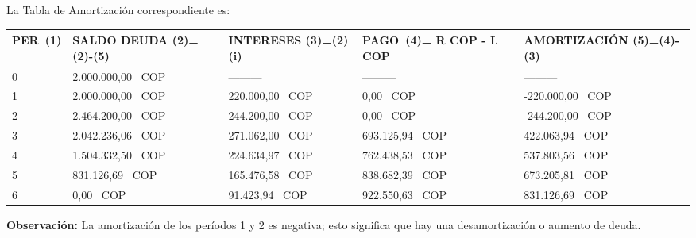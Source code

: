 La Tabla de Amortización correspondiente es:
\begin{spacing}{1.1}
	\begin{center}
		\begin{tabular}{|p{1cm}|p{2.5cm}|p{2.5cm}|p{2.5cm}|p{3cm}|}
			\hline
			\rowcolor{white!50}
			\textbf{PER\ (1)} & \textbf{SALDO DEUDA (2)=(2)-(5)} & \textbf{INTERESES  (3)=(2)(i)} & \textbf{PAGO\ (4)= R COP - L COP} & \textbf{AMORTIZACIÓN  (5)=(4)-(3)} \\ \hline
			
			0                 &  2.000.000,00 \ COP                  & ---------                       & ---------                   & ---------                          \\ \hline
			1                 &  2.000.000,00 \ COP                   &  220.000,00 \ COP                   & 0,00 \ COP                      &  -220.000,00 \ COP                      \\ \hline
			2                 &  2.464.200,00 \ COP                   &  244.200,00 \ COP                   &  0,00 \ COP                      &  -244.200,00 \ COP                      \\ \hline
			3                 &  2.042.236,06 \ COP                   &  271.062,00 \ COP                    &  693.125,94 \ COP                &  422.063,94 \ COP                       \\ \hline
			4                 &  1.504.332,50 \ COP                   &  224.634,97 \ COP                    &  762.438,53 \ COP                &  537.803,56 \ COP                       \\ \hline
			5                 &  831.126,69 \ COP                     &  165.476,58 \ COP                    &  838.682,39 \ COP                &  673.205,81 \ COP                       \\ \hline
			6                 &  0,00 \ COP                           &  91.423,94 \ COP                     &  922.550,63 \ COP                &  831.126,69 \ COP                       \\ \hline
		\end{tabular}
	\end{center}
\end{spacing}

\textbf{Observación: } La amortización de los períodos 1 y 2 es negativa; esto significa que hay una desamortización o aumento de deuda.\\


	
